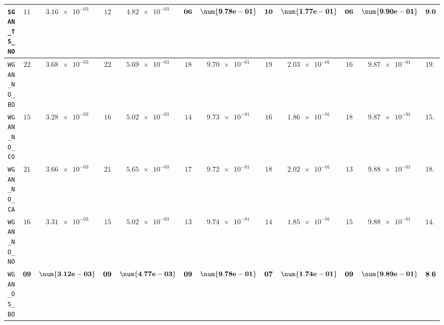\begin{table}[H]
\begin{tabularx}{\textwidth}{l||cC|cC|cC|cC|cC||c}
		\texttt{SGAN\_TS\_NO} & $ 11$ & $ \num{3.16e-03}$ & $ 12$ & $ \num{4.82e-03}$ & $\bf 06$ & $\bf \num{9.78e-01}$ & $\bf 10$ & $\bf \num{1.77e-01}$ & $\bf 06$ & $\bf \num{9.90e-01}$ & $\bf 9.0$  \\ \hline
		\texttt{WGAN\_NO\_BO} & $ 22$ & $ \num{3.68e-03}$ & $ 22$ & $ \num{5.69e-03}$ & $ 18$ & $ \num{9.70e-01}$ & $ 19$ & $ \num{2.03e-01}$ & $ 16$ & $ \num{9.87e-01}$ & $ 19.4$  \\
		\texttt{WGAN\_NO\_CO} & $ 15$ & $ \num{3.28e-03}$ & $ 16$ & $ \num{5.02e-03}$ & $ 14$ & $ \num{9.73e-01}$ & $ 16$ & $ \num{1.86e-01}$ & $ 18$ & $ \num{9.87e-01}$ & $ 15.8$  \\
		\texttt{WGAN\_NO\_CA} & $ 21$ & $ \num{3.66e-03}$ & $ 21$ & $ \num{5.65e-03}$ & $ 17$ & $ \num{9.72e-01}$ & $ 18$ & $ \num{2.02e-01}$ & $ 13$ & $ \num{9.88e-01}$ & $ 18.0$  \\
		\texttt{WGAN\_NO\_NO} & $ 16$ & $ \num{3.31e-03}$ & $ 15$ & $ \num{5.02e-03}$ & $ 13$ & $ \num{9.74e-01}$ & $ 14$ & $ \num{1.85e-01}$ & $ 15$ & $ \num{9.88e-01}$ & $ 14.6$  \\
		\texttt{WGAN\_OS\_BO} & $\bf 09$ & $\bf \num{3.12e-03}$ & $\bf 09$ & $\bf \num{4.77e-03}$ & $\bf 09$ & $\bf \num{9.78e-01}$ & $\bf 07$ & $\bf \num{1.74e-01}$ & $\bf 09$ & $\bf \num{9.89e-01}$ & $\bf 8.6$  \\

\end{tabularx}
\end{table}
